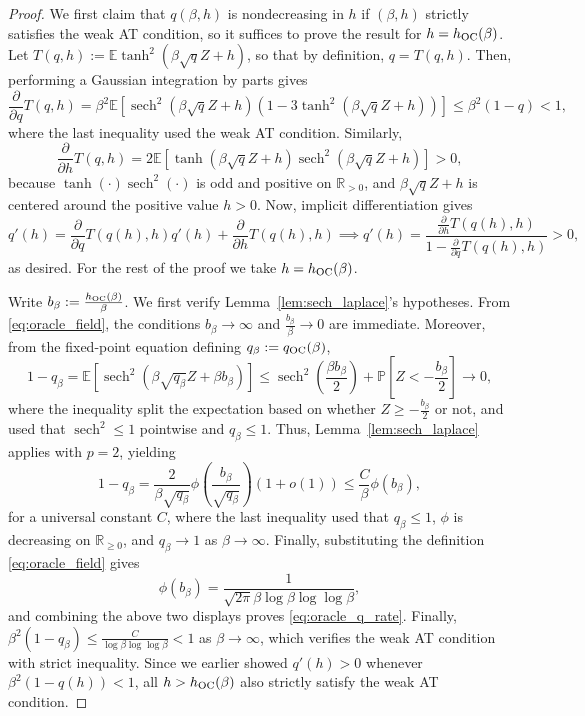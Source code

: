 \documentclass[11pt]{article}
\newcommand{\defeq}{:=}
\newcommand{\sech}{\operatorname{sech}}
\newcommand{\R}{\mathbb{R}}
\newcommand{\1}{\mathbf{1}}
\newcommand{\0}{\mathbf{0}}
\newcommand{\E}{\mathbb{E}}
\newcommand{\Par}[1]{\left(#1\right)}
\newcommand{\Brack}[1]{\left[#1\right]}
\newcommand{\Prob}{\mathbb{P}}
\renewcommand{\Pr}{\Prob}
\newcommand{\OC}{_{\rm OC}}
\begin{document}
\begin{proof}
We first claim that $q(\beta, h)$ is nondecreasing in $h$ if $(\beta, h)$ strictly satisfies the weak AT condition, so it suffices to prove the result for $h = h\OC(\beta)$. Let $T(q, h) \defeq \E \tanh^2(\beta\sqrt{q}Z + h)$, so that by definition, $q = T(q, h)$. Then, performing a Gaussian integration by parts gives
\[\frac{\partial}{\partial q} T(q, h) = \beta^2 \E\Brack{\sech^2\Par{\beta\sqrt{q}Z + h} \Par{1 - 3\tanh^2\Par{\beta\sqrt{q}Z + h}}} \le \beta^2(1 - q) < 1,\]
where the last inequality used the weak AT condition. Similarly,
\[\frac{\partial}{\partial h} T(q, h) = 2\E\Brack{\tanh\Par{\beta\sqrt{q}Z + h}\sech^2\Par{\beta\sqrt{q}Z + h}} > 0,\]
because $\tanh(\cdot)\sech^2(\cdot)$ is odd and positive on $\R_{> 0}$, and $\beta\sqrt{q}Z + h$ is centered around the positive value $h > 0$.
Now, implicit differentiation gives
\[q'(h) = \frac{\partial}{\partial q} T(q(h), h) q'(h) + \frac{\partial}{\partial h} T(q(h), h) \implies q'(h) = \frac{\frac{\partial}{\partial h} T(q(h), h)}{1 - \frac{\partial}{\partial q} T(q(h), h)} > 0,\]
as desired. For the rest of the proof we take $h = h\OC(\beta)$.

Write $b_\beta\defeq \frac{h_{\rm OC}(\beta)}{\beta}$.
We first verify Lemma~\ref{lem:sech_laplace}'s hypotheses. From \eqref{eq:oracle_field}, the conditions $b_\beta \to \infty$ and $\frac{b_\beta}{\beta} \to 0$ are immediate. Moreover, from the fixed-point equation defining $q_\beta \defeq q\OC(\beta)$,
\[1 - q_\beta = \E\Brack{\sech^2\Par{\beta\sqrt{q_\beta} Z + \beta b_\beta}} \le \sech^2\Par{\frac{\beta b_\beta}{2}} + \Pr\Brack{Z < -\frac{b_\beta}{2}} \to 0,\]
where the inequality split the expectation based on whether $Z \ge -\frac{b_\beta}{2}$ or not, and used that $\sech^2 \le 1$ pointwise and $q_\beta \le 1$. Thus,
Lemma~\ref{lem:sech_laplace} applies with $p = 2$, yielding
\[
    1-q_\beta
    =
    \frac{2}{\beta\sqrt{q_\beta}}
    \phi\Par{
        \frac{b_\beta}{\sqrt{q_\beta}}
    }\Par{1 + o(1)} \le \frac{C}{\beta} \phi(b_\beta),
\]
for a universal constant $C$,
where the last inequality used that $q_\beta \le 1$, $\phi$ is decreasing on $\R_{\ge 0}$, and $q_\beta \to 1$ as $\beta \to \infty$.
Finally, substituting the definition \eqref{eq:oracle_field} gives
\[
    \phi(b_\beta)
    =
    \frac{1}{
        \sqrt{2\pi}
        \beta
        \log\beta
        \log\log\beta
    },
\]
and combining the above two displays proves \eqref{eq:oracle_q_rate}. Finally,
$\beta^2(1-q_\beta)\le \frac{C}{\log\beta\log\log\beta} <1$ as $\beta \to \infty$, which verifies the weak AT condition with strict inequality. Since we earlier showed $q'(h) > 0$ whenever $\beta^2(1 - q(h)) < 1$, all $h > h\OC(\beta)$ also strictly satisfy the weak AT condition.
\end{proof}
\end{document}
